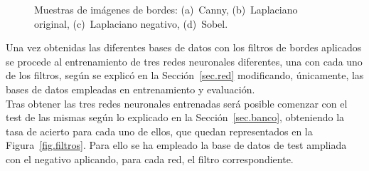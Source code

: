 \begin{figure}[H]
	\centering
	 \hspace{10pt}
	 \hspace{10pt}
	 \hspace{10pt}
	\caption{Muestras de imágenes de bordes: (a)~Canny, (b)~Laplaciano original, (c)~Laplaciano negativo, (d)~Sobel.}
	\label{fig.bordes}
\end{figure}

Una vez obtenidas las diferentes bases de datos con los filtros de bordes aplicados se procede al entrenamiento de tres redes neuronales diferentes, una con cada uno de los filtros, según se explicó en la Sección~\ref{sec.red} modificando, únicamente, las bases de datos empleadas en entrenamiento y evaluación.\\

Tras obtener las tres redes neuronales entrenadas será posible comenzar con el test de las mismas según lo explicado en la Sección~\ref{sec.banco}, obteniendo la tasa de acierto para cada uno de ellos, que quedan representados en la Figura~\ref{fig.filtros}. Para ello se ha empleado la base de datos de test ampliada con el negativo aplicando, para cada red, el filtro correspondiente.


